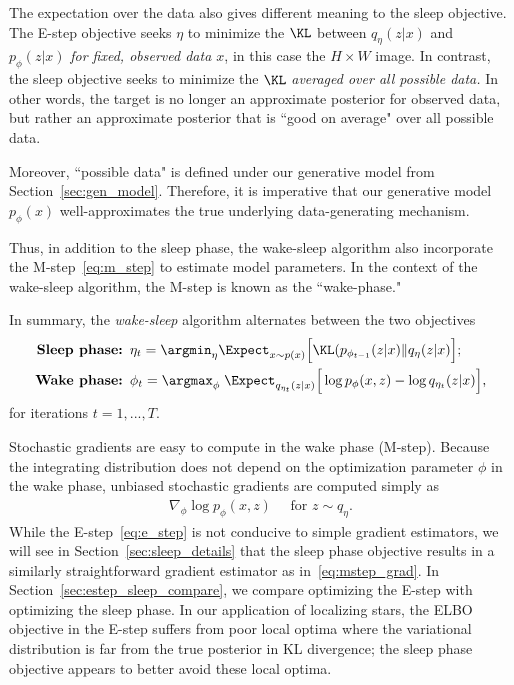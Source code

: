 The expectation over the data also gives different meaning to the sleep objective. The E-step objective seeks $\eta$ to minimize the $\KL$ between $q_\eta(z | x)$ and $p_\phi(z | x)$ {\itshape for fixed, observed data $x$},
in this case the $H\times W$ image. In contrast, the sleep objective seeks to minimize the $\KL$ {\itshape averaged over all possible data. } In other words, the target is no longer an approximate posterior for observed data, but rather an approximate posterior that is ``good on average" over all possible data.

Moreover, ``possible data" is defined under our generative model from Section~\ref{sec:gen_model}. Therefore, it is imperative that our generative model $p_\phi(x)$ well-approximates the true underlying data-generating mechanism. 

Thus, in addition to the sleep phase, the wake-sleep algorithm also incorporate the M-step~\eqref{eq:m_step} to estimate model parameters. In the context of the wake-sleep algorithm, the M-step is known as the ``wake-phase."

In summary, the {\itshape wake-sleep} algorithm alternates between the two objectives 
\begin{align}
    \text{{\bf Sleep phase: }} & 
    \eta_{t} = \argmin_{\eta} \Expect_{x \sim p(x)}\Big[\KL(p_{\phi_{t-1}}(z | x) \| q_\eta(z | x)\Big]
    \label{eq:sleep_phase_summary}; 
    \\
    \text{{\bf Wake phase: }} & \phi_{t} = \argmax_{\phi}\; \Expect_{q_{\eta_t}(z | x)}\Big[\log p_{\phi}(x, z) - \log q_{\eta_t}(z | x)\Big],
    \label{eq:wake_phase_summary}
\end{align} 
for iterations $t = 1, ..., T$. 

Stochastic gradients are easy to compute in the wake phase (M-step). Because the integrating distribution does not depend on the optimization parameter $\phi$ in the wake phase, unbiased stochastic gradients are computed simply as 
\begin{align}
    \nabla_\phi \log p_\phi(x, z) \quad \text{ for } z\sim q_\eta. 
    \label{eq:mstep_grad}
\end{align}
While the E-step~\eqref{eq:e_step} is not conducive to simple gradient estimators, we will see in Section~\ref{sec:sleep_details} that the sleep phase objective
results in a similarly straightforward gradient estimator as in~\eqref{eq:mstep_grad}. 
In Section~\ref{sec:estep_sleep_compare}, 
we compare optimizing the E-step with optimizing the sleep phase. In our application of localizing stars,
the ELBO objective in the E-step suffers from poor local optima where the variational distribution is far from the true posterior in KL divergence; the sleep phase objective appears to better avoid these local optima. 

